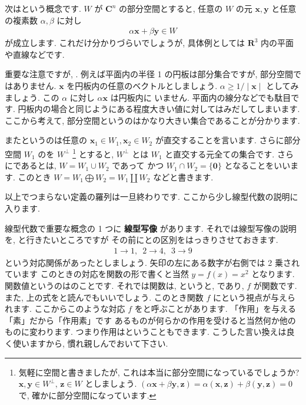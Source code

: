\documentclass[openany, a4paper, oneside]{book}
\theoremstyle{break}
\theoremstyle{breakdefn}
\begin{document}
次はという概念です.
 $W$ が $\bm{C}^n$ の部分空間とすると,
任意の $W$ の元 $\bm{x},\bm{y}$ と任意の複素数 $\alpha,\beta$ に対し
    \begin{align}
        \alpha \bm{x} + \beta \bm{y} \in W
    \end{align}
が成立します. これだけ分かりづらいでしょうが, 具体例としては $\bm{R}^3$ 内の平面や直線などです.

重要な注意ですが, .
例えば平面内の半径 1 の円板は部分集合ですが, 部分空間ではありません.
 $\bm{x}$ を円板内の任意のベクトルとしましょう.
 $\alpha \geq 1/\mid \bm{x} \mid$ としてみましょう. この $\alpha$ に対し $\alpha \bm{x}$ は円板内に
いません. 平面内の線分などでも駄目です. 円板内の場合と同じようにある程度大きい値に対してはみだしてしまいます.
ここから考えて, 部分空間というのはかなり大きい集合であることが分かります.

またというのは任意の $\bm{x}_1 \in W_1,\bm{x}_2 \in W_2$ が直交することを言います.
さらに部分空間 $W_1$ のを $W^{\perp}$ \footnote{気軽に空間と書きましたが, これは本当に部分空間になっているでしょうか?
$\bm{x},\bm{y} \in W^{\perp},\, \bm{z} \in W$ としましょう.
$(\alpha \bm{x} + \beta\bm{y},\bm{z}) = \alpha (\bm{x},\bm{z}) + \beta (\bm{y},\bm{z}) =0$
で, 確かに部分空間になっています.
 }
とすると,  $W^{\perp}$ とは
 $W_1$ と直交する元全ての集合です.
さらにであるとは,  $W = W_1 \cup W_2$ であって
かつ $W_1 \cap W_2 = \{ \bm{0} \}$ となることをいいます.
このとき $W = W_1 \bigoplus W_2 = W_1 \amalg W_2$ などと書きます.

以上でつまらない定義の羅列は一旦終わりです.
ここから少し線型代数の説明に入ります.

線型代数で重要な概念の 1 つに \textbf{線型写像} があります.
それでは線型写像の説明を, と行きたいところですが
その前にとの区別をはっきりさせておきます.
\begin{align}
1 \longrightarrow 1 ,\,\,\, 2 \longrightarrow 4 ,\,\,\, 3 \longrightarrow 9
\end{align}
という対応関係があったとしましょう. 矢印の左にある数字が右側では 2 乗されています
このときの対応を関数の形で書くと当然 $y = f (x) = x^{2}$ となります.
関数値というのはのことです. それでは関数は, というと,
であり,  $f$ が関数です.
また, 上の式をと読んでもいいでしょう.
このとき関数 $f$ にという視点が与えられます.
ここからこのような対応 $f$ をと呼ぶことがあります.
「作用」を与える「素」だから「作用素」です
あるものが何らかの作用を受けると当然何か他のものに変わります.
つまり作用はということもできます.
こうした言い換えは良く使いますから, 慣れ親しんでおいて下さい.
\end{document}

